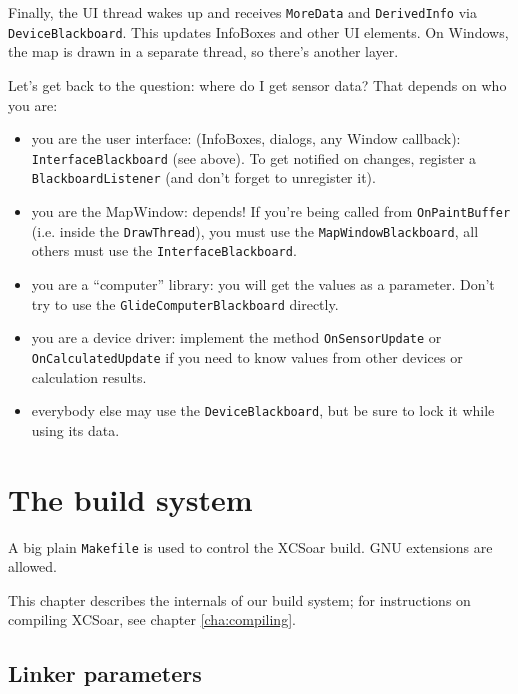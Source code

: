 \documentclass[a4paper,12pt]{refrep}
\begin{document}
Finally, the UI thread wakes up and receives \texttt{MoreData} and
\texttt{DerivedInfo} via \texttt{DeviceBlackboard}.  This updates
InfoBoxes and other UI elements.  On Windows, the map is drawn in a
separate thread, so there's another layer.

Let's get back to the question: where do I get sensor data?  That
depends on who you are:

\begin{itemize}

\item you are the user interface: (InfoBoxes, dialogs, any Window
  callback): \texttt{InterfaceBlackboard} (see above).  To get
  notified on changes, register a \texttt{BlackboardListener} (and
  don't forget to unregister it).

\item you are the MapWindow: depends!  If you're being called from
  \texttt{OnPaintBuffer} (i.e. inside the \texttt{DrawThread}), you
  must use the \texttt{MapWindowBlackboard}, all others must use the
  \texttt{InterfaceBlackboard}.

\item you are a ``computer'' library: you will get the values as a
  parameter.  Don't try to use the \texttt{GlideComputerBlackboard}
  directly.

\item you are a device driver: implement the method
  \texttt{OnSensorUpdate} or \texttt{OnCalculatedUpdate} if you need
  to know values from other devices or calculation results.

\item everybody else may use the \texttt{DeviceBlackboard}, but be
  sure to lock it while using its data.

\end{itemize}


\chapter{The build system}\label{cha:build}

A big plain \texttt{Makefile} is used to control the XCSoar build.
GNU extensions are allowed.

This chapter describes the internals of our build system; for
instructions on compiling XCSoar, see chapter \ref{cha:compiling}.

\section{Linker parameters}
\end{document}
